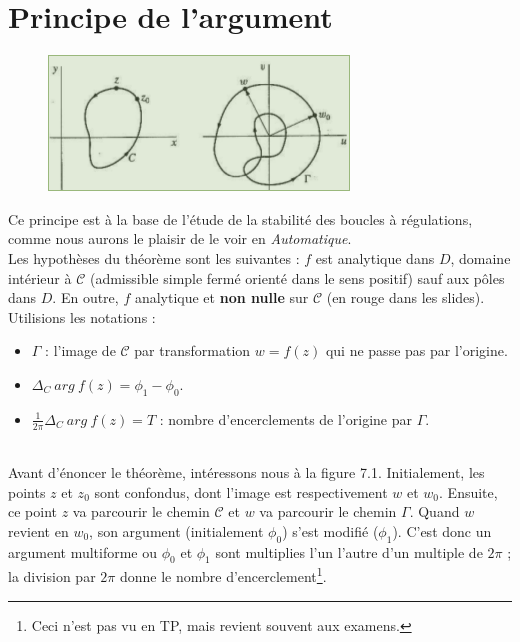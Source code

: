 \section{Principe de l'argument}
\begin{figure}
\includegraphics[scale=0.4]{ch7/image1.png}
\end{figure}
Ce principe est à la base de l'étude de la stabilité des boucles à régulations, comme 
nous aurons le plaisir de le voir en \textit{Automatique}.\\
Les hypothèses du théorème sont les suivantes : $f$ est analytique dans $D$, domaine
intérieur à $\mathcal{C}$ (admissible simple fermé orienté dans le sens positif) sauf 
aux pôles dans $D$. En outre, $f$ analytique et \textbf{non nulle} sur $\mathcal{C}$
(en rouge dans les slides).\\
Utilisions les notations  :\ \\
\begin{itemize}
\item $\Gamma$ : l'image de $\mathcal{C}$ par transformation $w=f(z)$ qui ne passe pas
par l'origine.
\item $\Delta_C\ arg\ f(z) = \phi_1-\phi_0$.
\item $\frac{1}{2\pi}\Delta_C\ arg\ f(z) = T$ : nombre d'encerclements de l'origine par
$\Gamma$.
\end{itemize}\ \\
Avant d'énoncer le théorème, intéressons nous à la figure 7.1. Initialement, les points
$z$ et $z_0$ sont confondus, dont l'image est respectivement $w$ et $w_0$. Ensuite, 
ce point $z$ va parcourir le chemin $\mathcal{C}$ et $w$ va parcourir le chemin $\Gamma$. 
Quand $w$ revient en $w_0$, son argument (initialement $\phi_0$) s'est modifié ($\phi_1$). 
C'est donc un argument multiforme ou $\phi_0$ et $\phi_1$ sont multiplies l'un l'autre 
d'un multiple de $2\pi$ ; la division par $2\pi$ donne le nombre  d'encerclement\footnote{
Ceci n'est pas vu en TP, mais revient souvent aux examens.}.\\



